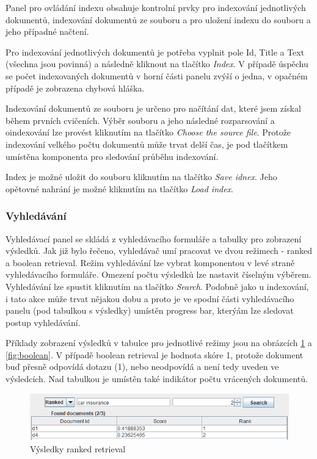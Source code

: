 \documentclass[11pt,a4paper]{scrartcl}
\begin{document}
	Panel pro ovládání indexu obsahuje kontrolní prvky pro indexování jednotlivých dokumentů, indexování dokumentů ze souboru a pro uložení indexu do souboru a jeho případné načtení.
	
	Pro indexování jednotlivých dokumentů je potřeba vyplnit pole Id, Title a Text (všechna jsou povinná) a následně kliknout na tlačítko \textit{Index}. V případě úspěchu se počet indexovaných dokumentů v horní části panelu zvýší o jedna, v opačném případě je zobrazena chybová hláška.
	
	Indexování dokumentů ze souboru je určeno pro načítání dat, které jsem získal během prvních cvičeních. Výběr souboru a jeho následné rozparsování a oindexování lze provést kliknutím na tlačítko \textit{Choose the source file}. Protože indexování velkého počtu dokumentů může trvat delší čas, je pod tlačítkem umístěna komponenta pro sledování průběhu indexování. 
	
	Index je možné uložit do souboru kliknutím na tlačítko \textit{Save idnex}. Jeho opětovné nahrání je možné kliknutím na tlačítko \textit{Load index}.

	\subsubsection{Vyhledávání}

	Vyhledávací panel se skládá z vyhledávacího formuláře a tabulky pro zobrazení výsledků. Jak již bylo řečeno, vyhledávač umí pracovat ve dvou režimech - ranked a boolean retrieval. Režim vyhledávání lze vybrat komponentou v levé straně vyhledávacího formuláře. Omezení počtu výsledků lze nastavit číselným výběrem. Vyhledávání lze spustit kliknutím na tlačítko \textit{Search}. Podobně jako u indexování, i tato akce může trvat nějakou dobu a proto je ve spodní části vyhledávacího panelu (pod tabulkou s výsledky) umístěn progress bar, kterýám lze sledovat postup vyhledávání.   
	
	Příklady zobrazení výsledků v tabulce pro jednotlivé režimy jsou na obrázcích \ref{fig:ranked} a \ref{fig:boolean}. V případě boolean retrieval je hodnota skóre 1, protože dokument buď přesně odpovídá dotazu (1), nebo neodpovídá a není tedy uveden ve výsledcích. Nad tabulkou je umístěn také indikátor počtu vrácených dokumentů.

	\begin{figure}[h]
		\centering
		\includegraphics[width=\linewidth]{gui-ranked-res}
		\caption{Výsledky ranked retrieval}
		\label{fig:ranked}
	\end{figure}
\end{document}
